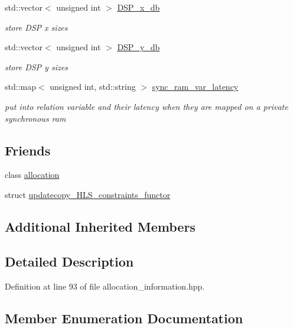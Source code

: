 \begin{DoxyCompactItemize}
std\+::vector$<$ unsigned int $>$ \hyperlink{classAllocationInformation_a04bdbd182db9e4ca294b7875c5360937}{D\+S\+P\+\_\+x\+\_\+db}
\begin{DoxyCompactList}\small\item\em store D\+SP x sizes \end{DoxyCompactList}\item 
std\+::vector$<$ unsigned int $>$ \hyperlink{classAllocationInformation_aaecec7f461722fd6482afd446401d436}{D\+S\+P\+\_\+y\+\_\+db}
\begin{DoxyCompactList}\small\item\em store D\+SP y sizes \end{DoxyCompactList}\item 
std\+::map$<$ unsigned int, std\+::string $>$ \hyperlink{classAllocationInformation_a64173249b54a813f36ed1f15b5eabfba}{sync\+\_\+ram\+\_\+var\+\_\+latency}
\begin{DoxyCompactList}\small\item\em put into relation variable and their latency when they are mapped on a private synchronous ram \end{DoxyCompactList}\end{DoxyCompactItemize}
\subsection*{Friends}
\begin{DoxyCompactItemize}
\item 
class \hyperlink{classAllocationInformation_a2dc219c556df071c0061c3e9ddfa1dca}{allocation}
\item 
struct \hyperlink{classAllocationInformation_ae62048173f29362c5fb37b7b34b40f59}{updatecopy\+\_\+\+H\+L\+S\+\_\+constraints\+\_\+functor}
\end{DoxyCompactItemize}
\subsection*{Additional Inherited Members}


\subsection{Detailed Description}


Definition at line 93 of file allocation\+\_\+information.\+hpp.



\subsection{Member Enumeration Documentation}
\mbox{\label{classAllocationInformation_aab74a04623ed2f1fb1708c8007a1736c}} 
